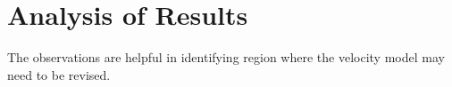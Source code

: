 
\section{Analysis of Results}

The observations are helpful in identifying region where the velocity model may need to be revised. 
